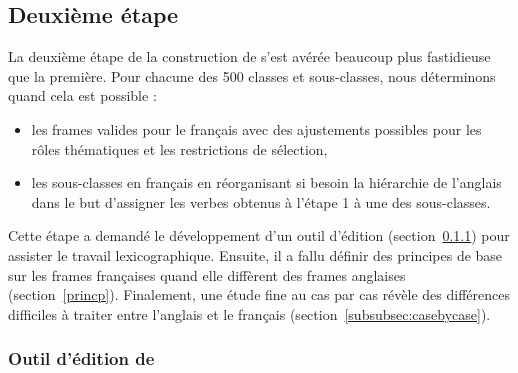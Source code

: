 

\subsection{Deuxième étape}\label{second}

La deuxième étape de la construction de \verbenet{} s'est avérée beaucoup plus
fastidieuse que la première. Pour chacune des 500 classes et sous-classes, nous
déterminons quand cela est possible :

\begin{itemize}

    \item les frames valides pour le français avec des ajustements possibles
        pour les rôles thématiques et les restrictions de sélection,

    \item les sous-classes en français en réorganisant si besoin la hiérarchie
        de l'anglais dans le but d'assigner les verbes obtenus à l'étape 1 à
        une des sous-classes.

\end{itemize}

Cette étape a demandé le développement d'un outil d'édition
(section~\ref{toolquentin}) pour assister le travail lexicographique. Ensuite,
il a fallu définir des principes de base sur les frames françaises quand elle
diffèrent des frames anglaises (section~\ref{princp}). Finalement, une étude
fine au cas par cas révèle des différences difficiles à traiter entre l'anglais
et le français (section~\ref{subsubsec:casebycase}).

\subsubsection{Outil d'édition de \verbenet{}}\label{toolquentin}

